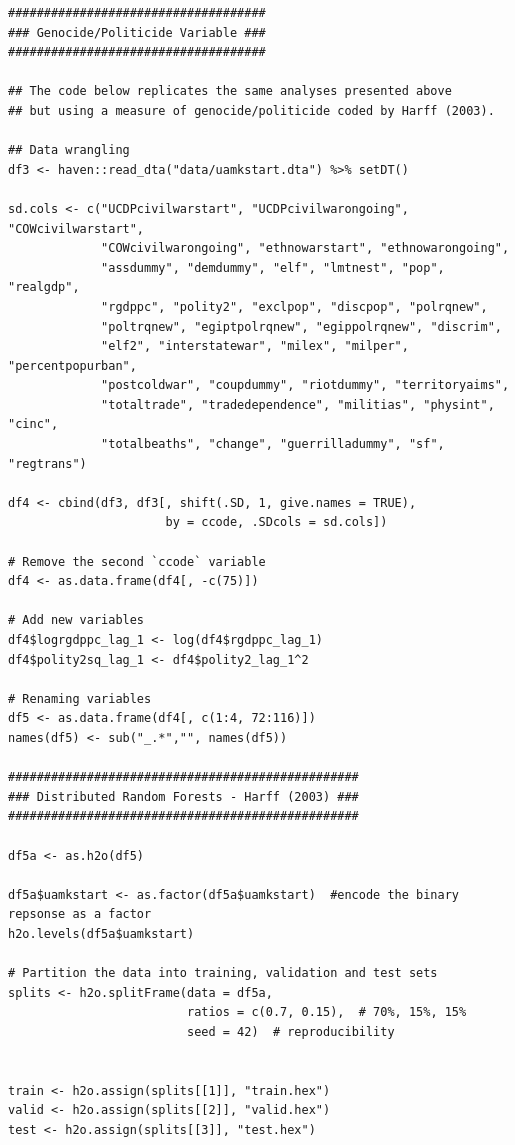 \begin{verbatim}
####################################
### Genocide/Politicide Variable ###
####################################

## The code below replicates the same analyses presented above
## but using a measure of genocide/politicide coded by Harff (2003).

## Data wrangling
df3 <- haven::read_dta("data/uamkstart.dta") %>% setDT()

sd.cols <- c("UCDPcivilwarstart", "UCDPcivilwarongoing", "COWcivilwarstart",
             "COWcivilwarongoing", "ethnowarstart", "ethnowarongoing",
             "assdummy", "demdummy", "elf", "lmtnest", "pop", "realgdp",
             "rgdppc", "polity2", "exclpop", "discpop", "polrqnew",
             "poltrqnew", "egiptpolrqnew", "egippolrqnew", "discrim",
             "elf2", "interstatewar", "milex", "milper", "percentpopurban",
             "postcoldwar", "coupdummy", "riotdummy", "territoryaims",
             "totaltrade", "tradedependence", "militias", "physint", "cinc",
             "totalbeaths", "change", "guerrilladummy", "sf", "regtrans")

df4 <- cbind(df3, df3[, shift(.SD, 1, give.names = TRUE),
                      by = ccode, .SDcols = sd.cols]) 

# Remove the second `ccode` variable
df4 <- as.data.frame(df4[, -c(75)])

# Add new variables
df4$logrgdppc_lag_1 <- log(df4$rgdppc_lag_1)
df4$polity2sq_lag_1 <- df4$polity2_lag_1^2

# Renaming variables
df5 <- as.data.frame(df4[, c(1:4, 72:116)])
names(df5) <- sub("_.*","", names(df5)) 

#################################################
### Distributed Random Forests - Harff (2003) ###
#################################################

df5a <- as.h2o(df5)

df5a$uamkstart <- as.factor(df5a$uamkstart)  #encode the binary repsonse as a factor
h2o.levels(df5a$uamkstart)

# Partition the data into training, validation and test sets
splits <- h2o.splitFrame(data = df5a, 
                         ratios = c(0.7, 0.15),  # 70%, 15%, 15%
                         seed = 42)  # reproducibility


train <- h2o.assign(splits[[1]], "train.hex")   
valid <- h2o.assign(splits[[2]], "valid.hex") 
test <- h2o.assign(splits[[3]], "test.hex")


\end{verbatim}
